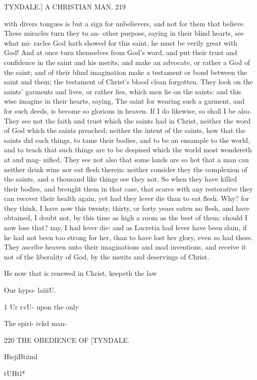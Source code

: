 \documentclass{custom}
\begin{document}
TYNDALE.]
A CHRISTIAN MAN.
219

with divers tongues is but a sign for unbelievers, and not 
for them that believe. These miracles turn they to an- 
other purpose, saying in their blind hearts, see what mi- 
racles God hath showed for this saint, he must be verily 
great with God! And at once turn themselves from God's 
word, and put their trust and confidence in the saint and 
his merits, and make an advocate, or rather a God of the 
saint; and of their blind imagination make a testament or 
bond between the saint and them; the testament of Christ's 
blood clean forgotten. They look on the saints' garments 
and lives, or rather lies, which men lie on the saints:
and this wise imagine in their hearts, saying, The saint for
wearing such a garment, and for such deeds, is become 
so glorious in heaven. If I do likewise, so shall I be 
also. They see not the faith and trust which the saints had
in Christ, neither the word of God which the saints 
preached; neither the intent of the saints, how that the 
saints did such things, to tame their bodies, and to be an 
ensample to the world, and to teach that such things are 
to be despised which the world most wondereth at and mag- 
nified. They see not also that some lands are so hot 
that a man can neither drink wine nor eat flesh therein:
neither consider they the complexion of the saints, and a 
thousand like things see they not. So when they have 
killed their bodies, and brought them in that case, that 
scarce with any restorative they can recover their health
again, yet had they lever die than to eat flesh. Why?
for they think, I have now this twenty, thirty, or forty 
years eaten no flesh, and have obtained, I doubt not, by 
this time as high a room as the best of them: should 
I now lose that? nay, I had lever die: and as Lucretia 
had lever have been slain, if he had not been too strong for 
her, than to have lost her glory, even so had these. They 
ascribe heaven unto their imaginations and mad inventions,
and receive it not of the liberality of God, by the merits 
and deservings of Christ. 

He now that is renewed in Christ, keepeth the law 

Our hypo- 
laiiiU. 

1 Ur r«U- 
upon the 
only 

The spiri- 
ivkd man- 


220
THE OBEDIENCE OF
[TYNDALE.

HiejiBtiiml 

tUHtl* 
\end{document}
